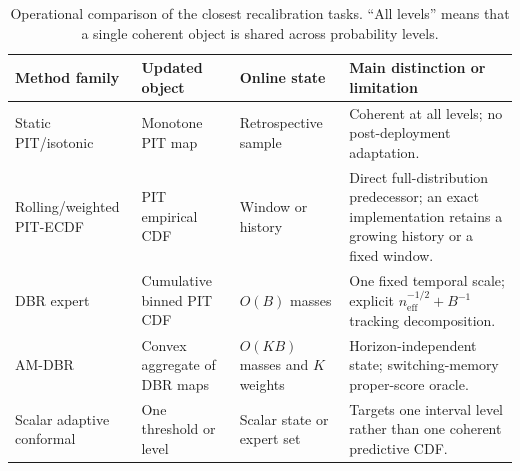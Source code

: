 \begin{table}[t]
\centering
\small
\caption{Operational comparison of the closest recalibration tasks. ``All
levels'' means that a single coherent object is shared across probability
levels.}
\label{tab:method-comparison}
\begin{tabularx}{\textwidth}{@{}
>{\raggedright\arraybackslash}p{}
>{\raggedright\arraybackslash}p{}
>{\raggedright\arraybackslash}p{}
>{\raggedright\arraybackslash}X@{}}
\toprule
Method family & Updated object & Online state & Main distinction or limitation \\
\midrule
Static PIT/isotonic & Monotone PIT map & Retrospective sample & Coherent at all levels; no post-deployment adaptation. \\
Rolling/weighted PIT-ECDF & PIT empirical CDF & Window or history & Direct full-distribution predecessor; an exact implementation retains a growing history or a fixed window. \\
DBR expert & Cumulative binned PIT CDF & $O(B)$ masses & One fixed temporal scale; explicit $n_{\mathrm{eff}}^{-1/2}+B^{-1}$ tracking decomposition. \\
AM-DBR & Convex aggregate of DBR maps & $O(KB)$ masses and $K$ weights & Horizon-independent state; switching-memory proper-score oracle. \\
Scalar adaptive conformal & One threshold or level & Scalar state or expert set & Targets one interval level rather than one coherent predictive CDF. \\
\bottomrule
\end{tabularx}
\end{table}
